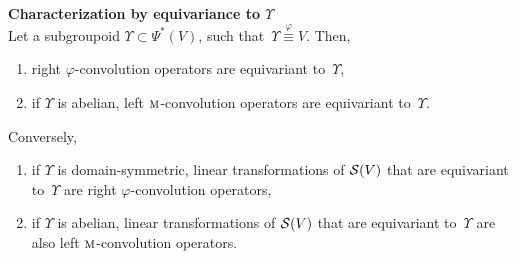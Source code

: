 \begin{proposition}\textbf{Characterization by equivariance to $\Upsilon$}\\
Let a subgroupoid $\Upsilon \subset \Psi^*(V)$, such that~$\Upsilon \overset\varphi\equiv V$. Then,
\begin{enumerate}[label=(\roman*)]
  \item right $\varphi$-convolution operators are equivariant to~$\Upsilon$,\label{enum:i}
  \item if $\Upsilon$ is abelian, left $\operatorname{\textsc{m}}$-convolution operators are equivariant to~$\Upsilon$.\label{enum:ii}
\end{enumerate}
Conversely,
\begin{enumerate}[label=(\roman*)]
  \item if $\Upsilon$ is domain-symmetric, linear transformations of $\mathcal{S}(V)$ that are equivariant to~$\Upsilon$ are right $\varphi$-convolution operators,
  \item if $\Upsilon$ is abelian, linear transformations of $\mathcal{S}(V)$ that are equivariant to~$\Upsilon$ are also left $\operatorname{\textsc{m}}$-convolution operators.
\end{enumerate}
\end{proposition}

